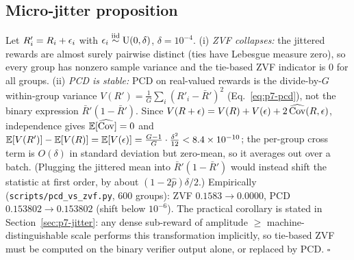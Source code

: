 \subsection{Micro-jitter proposition}
\label{sec:p7-appendix-jitter}
Let $R'_i = R_i + \epsilon_i$ with $\epsilon_i \stackrel{\text{iid}}{\sim}
\mathrm{U}(0, \delta)$, $\delta = 10^{-4}$. (i) \emph{ZVF collapses:} the
jittered rewards are almost surely pairwise distinct (ties have Lebesgue
measure zero), so every group has nonzero sample variance and the tie-based
ZVF indicator is $0$ for all groups. (ii) \emph{PCD is stable:} PCD on real-valued rewards is the divide-by-$G$
within-group variance $V(R')=\frac1G\sum_i(R'_i-\bar R')^2$ (Eq.~\eqref{eq:p7-pcd}),
not the binary expression $\bar R'(1-\bar R')$. Since
$V(R+\epsilon)=V(R)+V(\epsilon)+2\,\widehat{\mathrm{Cov}}(R,\epsilon)$, independence gives
$\mathbb{E}[\widehat{\mathrm{Cov}}]=0$ and
$\mathbb{E}[V(R')]-\mathbb{E}[V(R)]=\mathbb{E}[V(\epsilon)]=\frac{G-1}{G}\cdot\frac{\delta^2}{12}
<8.4\times10^{-10}$; the per-group cross term is $O(\delta)$ in standard
deviation but zero-mean, so it averages out over a batch. (Plugging the
jittered mean into $\bar R'(1-\bar R')$ would instead shift the statistic at
first order, by about $(1-2\hat p)\delta/2$.) Empirically
(\texttt{scripts/pcd\_vs\_zvf.py}, $600$ groups): ZVF $0.1583 \to 0.0000$,
PCD $0.153802 \to 0.153802$ (shift below $10^{-6}$). The practical
corollary is stated in Section~\ref{sec:p7-jitter}: any dense sub-reward of
amplitude $\geq$ machine-distinguishable scale performs this transformation
implicitly, so tie-based ZVF must be computed on the binary verifier output
alone, or replaced by PCD. \hfill$\square$

